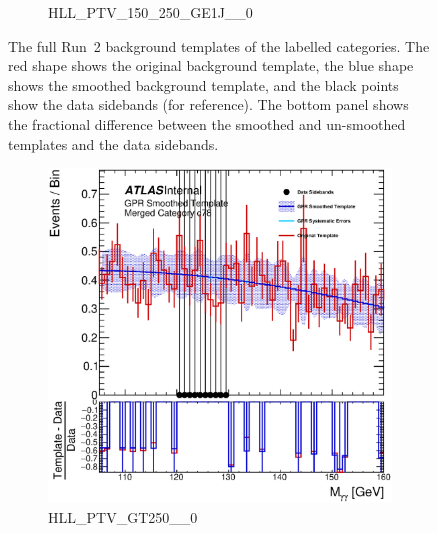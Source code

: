 \begin{figure}
\begin{center}
\begin{subfigure}[T]{0.49\linewidth}
	\caption{HLL\_PTV\_150\_250\_GE1J\_\_0}
\end{subfigure}
\caption{The full Run~2 background templates of the labelled categories. The red shape shows the original background template, the blue shape shows the smoothed background template, and the black points show the data sidebands (for reference). The bottom panel shows the fractional difference between the smoothed and un-smoothed templates and the data sidebands. }
 \label{fig:gpr_coupcat_19}
 \end{center}
\end{figure}

\begin{figure}
\begin{center}
\begin{subfigure}[T]{0.49\linewidth}
	\centering
	\includegraphics[width=\linewidth]{figures/background/gpr/coupCatTemplates/GPR_Smoothed_Plot_hmgg_c78.eps}
	\caption{HLL\_PTV\_GT250\_\_0}
\end{subfigure}
\begin{subfigure}[T]{0.49\linewidth}
	\centering

\end{subfigure}
\end{center}
\end{figure}
